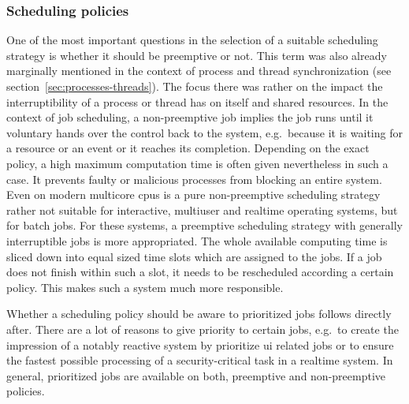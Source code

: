 \subsubsection*{Scheduling policies}
One of the most important questions in the selection of a suitable scheduling strategy is whether it should be preemptive or not.
This term was also already marginally mentioned in the context of process and thread synchronization (see section~\ref{sec:processes-threads}).
The focus there was rather on the impact the interruptibility of a process or thread has on itself and shared resources.
In the context of job scheduling, a non-preemptive job implies the job runs until it voluntary hands over the control back to the system, e.g.\ because it is waiting for a resource or an event or it reaches its completion\cite{mandl2014Grundkurs}.
Depending on the exact policy, a high maximum computation time is often given nevertheless in such a case.
It prevents faulty or malicious processes from blocking an entire system\cite{achilles2006betriebssysteme}.
Even on modern multicore \acp{cpu} is a pure non-preemptive scheduling strategy rather not suitable for interactive, multiuser and realtime operating systems, but for batch jobs.
For these systems, a preemptive scheduling strategy with generally interruptible jobs is more appropriated.
The whole available computing time is sliced down into equal sized time slots which are assigned to the jobs.
If a job does not finish within such a slot, it needs to be rescheduled according a certain policy\cite{brause2017betriebssysteme}.
This makes such a system much more responsible.

Whether a scheduling policy should be aware to prioritized jobs follows directly after.
There are a lot of reasons to give priority to certain jobs, e.g.\ to create the impression of a notably reactive system by prioritize \ac{ui} related jobs or to ensure the fastest possible processing of a security-critical task in a realtime system\cite{mandl2014Grundkurs}.
In general, prioritized jobs are available on both, preemptive and non-preemptive policies\cite{brause2017betriebssysteme}.

